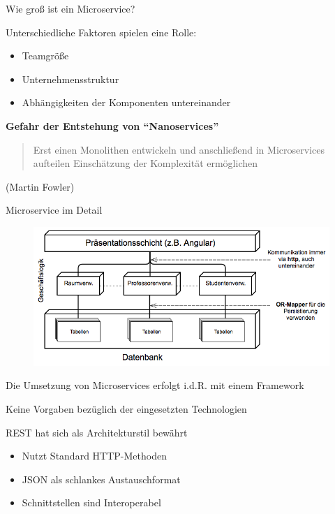 \documentclass[final]{beamer}
\newlength{\onecolwid}
\newlength{\twocolwid}
\begin{document}
\begin{frame}
\begin{columns}[t]
\begin{column}{\twocolwid}
\begin{columns}[t,totalwidth=\twocolwid]
\begin{column}{\onecolwid}
\begin{block}{Wie groß ist ein Microservice?}
\par Unterschiedliche Faktoren spielen eine Rolle:

\begin{itemize}
	\item Teamgröße
	\item Unternehmensstruktur
	\item Abhängigkeiten der Komponenten untereinander
\end{itemize}

\begin{center}\textbf{Gefahr der Entstehung von “Nanoservices” }\end{center} 

\vspace{1cm}
\noindent

\begin{quotation}
\noindent
\begin{center}
	Erst einen Monolithen entwickeln und anschließend in Microservices aufteilen Einschätzung der Komplexität ermöglichen
\end{center}
	
\end{quotation}
\begin{center}
	(Martin Fowler)
\end{center}
\end{block}

\begin{block}{Microservice im Detail}

\begin{figure}
\includegraphics{microservice_detail.png}	
\end{figure}

Die Umsetzung von Microservices erfolgt i.d.R. mit einem Framework


Keine Vorgaben bezüglich der eingesetzten Technologien


REST hat sich als Architekturstil bewährt
\begin{itemize}
	\item Nutzt Standard HTTP-Methoden
	\item JSON als schlankes Austauschformat
	\item Schnittstellen sind Interoperabel
\end{itemize}


\end{block}
\end{column}
\end{columns}
\end{column}
\end{columns}
\end{frame}
\end{document}
